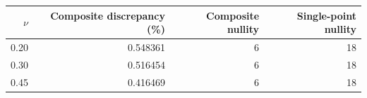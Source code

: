 \begin{tabular}{rrrr}
\hline
$\nu$ & Composite discrepancy (\%) & Composite nullity & Single-point nullity\\
\hline
0.20 & 0.548361 & 6 & 18\\
0.30 & 0.516454 & 6 & 18\\
0.45 & 0.416469 & 6 & 18\\
\hline
\end{tabular}
